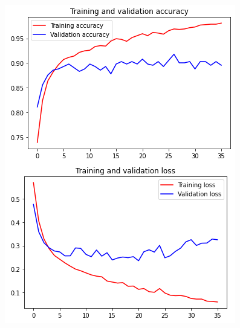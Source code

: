 \documentclass[11pt,a4paper,oneside]{article}
\begin{document}
\begin{figure}[h]
\centering
	\begin{minipage}[c]{.4\textwidth}
		\centering\setlength{\captionmargin}{0pt}%
		\includegraphics[width=.9\textwidth]{images/4.1/Siamese/AccuracyFT}
	\end{minipage}	
	\hspace{5mm}%
	\begin{minipage}[c]{.4\textwidth}
		\centering\setlength{\captionmargin}{0pt}%

\end{minipage}
\end{figure}
\end{document}
